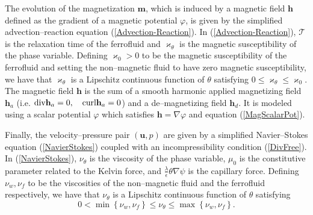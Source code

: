 \documentclass[11pt,fullpage]{article}
\newcommand{\eps}{\epsilon}
\newcommand{\set}[1]{\left\{#1\right\}}
\newcommand{\grad}{\nabla}
\newcommand{\diver}{\textup{div} }
\theoremstyle{lemma}
\theoremstyle{definition}
\theoremstyle{lemma}
\begin{document}
The evolution of the magnetization $\mathbf{m}$, which is induced by a magnetic field $\mathbf{h}$ defined as the gradient of a magnetic potential $\varphi$, is given by the simplified advection--reaction equation (\ref{Advection-Reaction}). In (\ref{Advection-Reaction}), $\mathscr{T}$ is the relaxation time of the ferrofluid and $\varkappa_\theta$ is the magnetic susceptibility of the phase variable. Defining $\varkappa_0>0$ to be the magnetic susceptibility of the ferrofluid and setting the non--magnetic fluid to have zero magnetic susceptibility, we have that $\varkappa_\theta$ is a Lipschitz continuous function of $\theta$ satisfying $0\leq \varkappa_\theta \leq \varkappa_0$. The magnetic field $\mathbf{h}$ is the sum of a smooth harmonic applied magnetizing field $\mathbf{h}_a$ (i.e. $\diver \mathbf{h}_a = 0,\quad \text{curl}\mathbf{h}_a=0$) and a de--magnetizing field $\mathbf{h}_d$. It is modeled using a scalar potential $\varphi$ which satisfies $\mathbf{h} = \grad \varphi$ and equation (\ref{MagScalarPot}). 

Finally, the velocity--pressure pair $(\mathbf{u}, p)$ are given by a simplified Navier--Stokes equation (\ref{NavierStokes}) coupled with an incompressibility condition (\ref{DivFree}). In (\ref{NavierStokes}), $\nu_\theta$ is the viscosity of the phase variable, $\mu_0$ is the constitutive parameter related to the Kelvin force, and $\frac{\lambda}{\eps}\theta\grad \psi$ is the capillary force. Defining $\nu_w, \nu_f$ to be the viscosities of the non--magnetic fluid and the ferrofluid respectively, we have that $\nu_\theta$ is a Lipschitz continuous function of $\theta$ satisfying
$$
	0 < \min\set{\nu_w, \nu_f} \leq \nu_\theta \leq \max\set{\nu_w, \nu_f}.
$$
\end{document}
